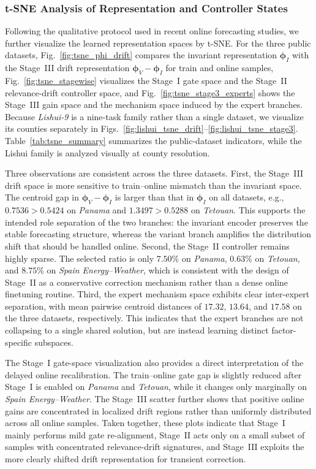 ﻿\documentclass[journal]{IEEEtran}
\newenvironment{auditproblemblock}{\begingroup\color{red}}{\endgroup}
\begin{document}
\subsubsection{t-SNE Analysis of Representation and Controller States}
\begin{auditproblemblock}
Following the qualitative protocol used in recent online forecasting studies, we further visualize the learned representation spaces by t-SNE. For the three public datasets, Fig.~\ref{fig:tsne_phi_drift} compares the invariant representation $\boldsymbol{\phi}_{I}$ with the Stage~III drift representation $\boldsymbol{\phi}_{V}-\boldsymbol{\phi}_{I}$ for train and online samples, Fig.~\ref{fig:tsne_stagewise} visualizes the Stage~I gate space and the Stage~II relevance-drift controller space, and Fig.~\ref{fig:tsne_stage3_experts} shows the Stage~III gain space and the mechanism space induced by the expert branches. Because \textit{Lishui-9} is a nine-task family rather than a single dataset, we visualize its counties separately in Figs.~\ref{fig:lishui_tsne_drift}--\ref{fig:lishui_tsne_stage3}. Table~\ref{tab:tsne_summary} summarizes the public-dataset indicators, while the Lishui family is analyzed visually at county resolution.

Three observations are consistent across the three datasets. First, the Stage~III drift space is more sensitive to train--online mismatch than the invariant space. The centroid gap in $\boldsymbol{\phi}_{V}-\boldsymbol{\phi}_{I}$ is larger than that in $\boldsymbol{\phi}_{I}$ on all datasets, e.g., $0.7536>0.5424$ on \textit{Panama} and $1.3497>0.5288$ on \textit{Tetouan}. This supports the intended role separation of the two branches: the invariant encoder preserves the stable forecasting structure, whereas the variant branch amplifies the distribution shift that should be handled online. Second, the Stage~II controller remains highly sparse. The selected ratio is only $7.50\%$ on \textit{Panama}, $0.63\%$ on \textit{Tetouan}, and $8.75\%$ on \textit{Spain Energy--Weather}, which is consistent with the design of Stage~II as a conservative correction mechanism rather than a dense online finetuning routine. Third, the expert mechanism space exhibits clear inter-expert separation, with mean pairwise centroid distances of $17.32$, $13.64$, and $17.58$ on the three datasets, respectively. This indicates that the expert branches are not collapsing to a single shared solution, but are instead learning distinct factor-specific subspaces.

The Stage~I gate-space visualization also provides a direct interpretation of the delayed online recalibration. The train--online gate gap is slightly reduced after Stage~I is enabled on \textit{Panama} and \textit{Tetouan}, while it changes only marginally on \textit{Spain Energy--Weather}. The Stage~III scatter further shows that positive online gains are concentrated in localized drift regions rather than uniformly distributed across all online samples. Taken together, these plots indicate that Stage~I mainly performs mild gate re-alignment, Stage~II acts only on a small subset of samples with concentrated relevance-drift signatures, and Stage~III exploits the more clearly shifted drift representation for transient correction.


\end{auditproblemblock}
\end{document}

